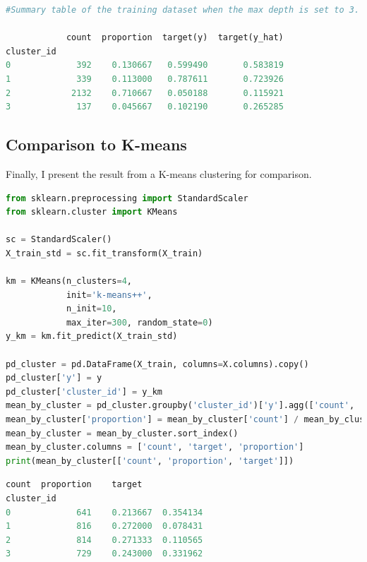 \documentclass{article}
\begin{document}
\begin{lstlisting}[language=Python,numbers=none] 
#Summary table of the training dataset when the max depth is set to 3.

            count  proportion  target(y)  target(y_hat)
cluster_id                                             
0             392    0.130667   0.599490       0.583819
1             339    0.113000   0.787611       0.723926
2            2132    0.710667   0.050188       0.115921
3             137    0.045667   0.102190       0.265285
\end{lstlisting}

\subsection{Comparison to K-means}
Finally, I present the result from a K-means clustering for comparison.

\begin{lstlisting}[language=Python] 
from sklearn.preprocessing import StandardScaler
from sklearn.cluster import KMeans

sc = StandardScaler()
X_train_std = sc.fit_transform(X_train)

km = KMeans(n_clusters=4,
            init='k-means++',
            n_init=10,
            max_iter=300, random_state=0)
y_km = km.fit_predict(X_train_std)

pd_cluster = pd.DataFrame(X_train, columns=X.columns).copy()
pd_cluster['y'] = y
pd_cluster['cluster_id'] = y_km
mean_by_cluster = pd_cluster.groupby('cluster_id')['y'].agg(['count', 'mean'])
mean_by_cluster['proportion'] = mean_by_cluster['count'] / mean_by_cluster['count'].sum()
mean_by_cluster = mean_by_cluster.sort_index()
mean_by_cluster.columns = ['count', 'target', 'proportion']
print(mean_by_cluster[['count', 'proportion', 'target']])
\end{lstlisting}

\begin{lstlisting}[language=Python] 
            count  proportion    target
cluster_id                             
0             641    0.213667  0.354134
1             816    0.272000  0.078431
2             814    0.271333  0.110565
3             729    0.243000  0.331962
\end{lstlisting}


\end{document}

